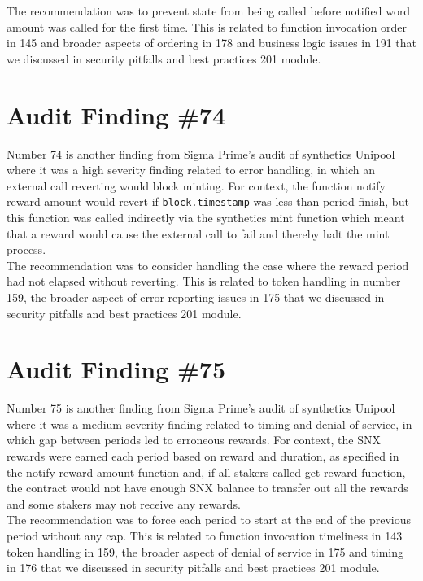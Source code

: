 The recommendation was to prevent state from being called before notified word amount was called for the first time. This is related to function invocation order in 145 and broader aspects of ordering in 178 and business logic issues in 191 that we discussed in security pitfalls and best practices 201 module.

\section{Audit Finding \#74}

Number 74 is another finding from Sigma Prime's audit of synthetics Unipool where it was a high severity finding related to error handling, in which an external call reverting would block minting. For context, the function notify reward amount would revert if \verb|block.timestamp| was less than period finish, but this function was called indirectly via the synthetics mint function which meant that a reward would cause the external call to fail and thereby halt the mint process.\\

The recommendation was to consider handling the case where the reward period had not elapsed without reverting. This is related to token handling in number 159, the broader aspect of error reporting issues in 175 that we discussed in security pitfalls and best practices 201 module.

\section{Audit Finding \#75}

Number 75 is another finding from Sigma Prime's audit of synthetics Unipool where it was a medium severity finding related to timing and denial of service, in which gap between periods led to erroneous rewards. For context, the SNX rewards were earned each period based on reward and duration, as specified in the notify reward amount function and, if all stakers called get reward function, the contract would not have enough SNX balance to transfer out all the rewards and some stakers may not receive any rewards.\\

The recommendation was to force each period to start at the end of the previous period without any cap. This is related to function invocation timeliness in 143 token handling in 159, the broader aspect of denial of service in 175 and timing in 176 that we discussed in security pitfalls and best practices 201 module.

